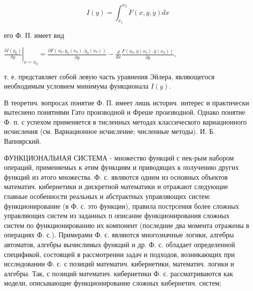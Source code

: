 \documentclass[10pt]{article}
\begin{document}
\[

I(y)=\int_{x_{1}}^{x_{2}} F(x, y, \dot{y}) d x

\]



его Ф. П. имеет вид



$\left.\frac{\delta I\left(y_{0}\right)}{\delta y}\right|_{x=x_{0}}=\frac{\partial F\left(x_{0}, y_{0}\left(x_{0}\right), \dot{y}_{0}\left(x_{0}\right)\right)}{\partial y}-\frac{d}{d x} \frac{F\left(x_{0}, y\left(x_{0}\right), \dot{y}\left(x_{0}\right)\right)}{\partial \dot{y}}$,



т. е. представляет собой левую часть уравнения Эйлера, являющегося необходимым условием минимума функционала $I(y)$.



В теоретич. вопросах понятие Ф. П. имеет лишь историч. интерес и практически вытеснено понятиями Гато производной и Фреше производной. Однако понятие Ф. п. с успехом применяется в тисленных методах классического вариационного исчисления (см. Вариационное исчисление; численные методы). И. Б. Вапнярский.



ФУНКЦИОНАЛЬНАЯ СИСТЕМА - множество функций с нек-рым набором операций, применяемых к әтим функциям и приводящих к получению других функций из әтого множества. Ф. с. являются одним из основных объектов математич. кибернетики и дискретной математики и отражают следующие главные особенности реальных и абстрактных управляющих систем: функционирование (в Ф. с. это функции), правила пострсения более сложных управляющих систем из заданных п описание функционирования сложных систем по функционированию их компонент (последние два момента отражены в операциях Ф. с.). Примерами Ф. с. являются многозначные логики, алгебры автоматов, алгебры вычислимых функций и др. Ф. с. обладает определенной спецификой, состоящей в рассмотрении задач и подходов, возникающих при исслөдовании Ф. с. с позиций математич. кибернетики, математич. логики и алгебры. Так, с позиций математич. кибернетики Ф. с. рассматриваются как модели, описывающие функционирование сложных кибернетич. систем;
\end{document}
